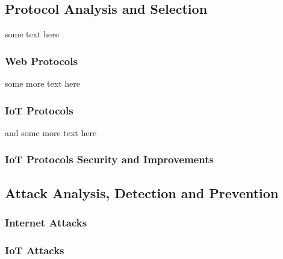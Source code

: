 \subsection{Protocol Analysis and Selection}
some text here			
\subsubsection{Web Protocols}
some more text here
\subsubsection{IoT Protocols}
and some more text here
\subsubsection{IoT Protocols Security and Improvements}
\subsection{Attack Analysis, Detection and Prevention}
\subsubsection{Internet Attacks}
\cite{Bose2015}
\subsubsection{IoT Attacks}
